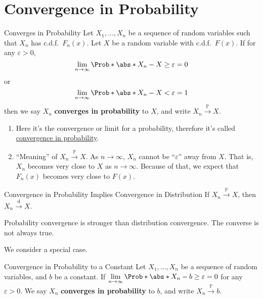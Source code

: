 \section{Convergence in Probability}
\begin{Definition}{Converges in Probability}{}
    Let $ X_1,\ldots,X_n $ be a sequence of random
    variables such that $ X_n $ has
    c.d.f.\ $ F_n(x) $. Let $ X $ be a random variable
    with c.d.f.\ $ F(x) $. If for any $ \varepsilon>0 $,
    \[ \lim\limits_{{n} \to {\infty}}
        \Prob*{\abs*{X_n-X}\ge \varepsilon}=0 \]
    or
    \[ \lim\limits_{{n} \to {\infty}}
        \Prob*{\abs*{X_n-X}<\varepsilon}=1 \]
    then we say $ X_n $ \textbf{converges in probability}
    to $ X $, and write $ X_n\stackrel{\mathbb{P}}{\to}X $.
\end{Definition}
\begin{Remark}{}{}
    \begin{enumerate}[label=(\roman*)]
        \item Here it's the convergence or limit for
              a probability, therefore it's called
              \underline{convergence in probability}.
        \item ``Meaning'' of $ X_n\stackrel{\mathbb{P}}{\to}X $.
              As $ n\to\infty $, $ X_n $ cannot be ``$ \varepsilon $''
              away from $ X $. That is, $ X_n $ becomes very
              close to $ X $ as $ n\to\infty $. Because of that,
              we expect that $ F_n(x) $ becomes very close to $ F(x) $.
    \end{enumerate}
\end{Remark}
\begin{Theorem}{Convergence in Probability Implies Convergence in Distribution}{}
    If $ X_n\stackrel{\mathbb{P}}{\to}X $, then $ X_n\stackrel{\text{d}}{\to} X $.
\end{Theorem}
\begin{Remark}{}{}
    Probability convergence is stronger than distribution convergence.
    The converse is not always true.
\end{Remark}
We consider a special case.
\begin{Definition}{Convergence in Probability to a Constant}{}
    Let $ X_1,\ldots,X_n $ be a sequence of random variables,
    and $ b $ be a constant. If $ \lim\limits_{{n} \to {\infty}}
        \Prob*{\abs*{X_n-b}\ge \varepsilon}=0 $
    for any $ \varepsilon>0 $. We say $ X_n $ \textbf{converges
        in probability} to $ b $, and write $ X_n\stackrel{\mathbb{P}}{\to}b $.
\end{Definition}
